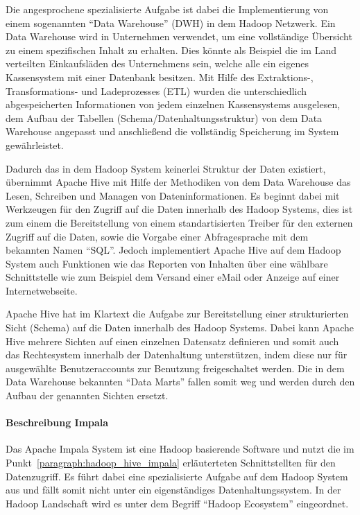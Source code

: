 Die angesprochene spezialisierte Aufgabe ist dabei die Implementierung
von einem sogenannten ``Data Warehouse'' (DWH) in dem Hadoop Netzwerk. Ein
Data Warehouse wird in Unternehmen verwendet, um eine vollständige Übersicht
zu einem spezifischen Inhalt zu erhalten. Dies könnte als Beispiel die im
Land verteilten Einkaufsläden des Unternehmens sein, welche alle ein eigenes
Kassensystem mit einer Datenbank besitzen. Mit Hilfe des Extraktions-,
Transformations- und Ladeprozesses (ETL) wurden die unterschiedlich
abgespeicherten Informationen von jedem einzelnen Kassensystems ausgelesen,
dem Aufbau der Tabellen (Schema/Datenhaltungsstruktur) von dem
Data Warehouse angepasst und anschließend die vollständig
Speicherung im System gewährleistet.

Dadurch das in dem Hadoop System keinerlei Struktur der Daten existiert,
übernimmt Apache Hive mit Hilfe der Methodiken von dem Data Warehouse das
Lesen, Schreiben und Managen von Dateninformationen. Es beginnt dabei mit
Werkzeugen für den Zugriff auf die Daten innerhalb des Hadoop Systems, dies
ist zum einem die Bereitstellung von einem standartisierten Treiber für den
externen Zugriff auf die Daten, sowie die Vorgabe einer Abfragesprache mit dem
bekannten Namen ``SQL''. Jedoch implementiert Apache Hive auf dem Hadoop System
auch Funktionen wie das Reporten von Inhalten über eine wählbare Schnittstelle
wie zum Beispiel dem Versand einer eMail oder Anzeige auf einer
Internetwebseite.

Apache Hive hat im Klartext die Aufgabe zur Bereitstellung einer strukturierten
Sicht (Schema) auf die Daten innerhalb des Hadoop Systems. Dabei kann Apache
Hive mehrere Sichten auf einen einzelnen Datensatz definieren und somit auch
das  Rechtesystem innerhalb der Datenhaltung unterstützen, indem diese nur
für ausgewählte Benutzeraccounts zur Benutzung freigeschaltet werden. Die in
dem Data Warehouse bekannten ``Data Marts'' fallen somit weg und werden durch
den Aufbau der genannten Sichten ersetzt.
\nl%

\paragraph{Beschreibung Impala}
\label{paragraph:impala_beschreibung}
Das Apache Impala System ist eine Hadoop basierende Software und nutzt die
im Punkt~\ref{paragraph:hadoop_hive_impala} erläuterteten Schnittstellten
für den Datenzugriff. Es führt dabei eine spezialisierte Aufgabe auf dem
Hadoop System aus und fällt somit nicht unter ein eigenständiges
Datenhaltungssystem. In der Hadoop Landschaft wird es unter dem Begriff
``Hadoop Ecosystem'' eingeordnet.

